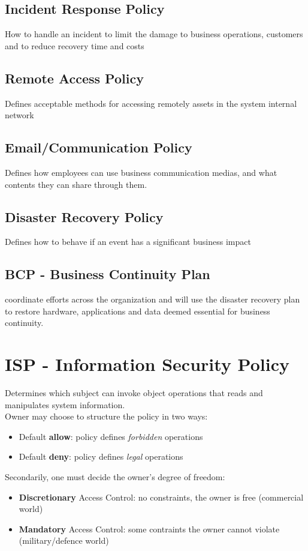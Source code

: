 \subsection*{Incident Response Policy}
How to handle an incident to limit the damage to business operations, customers and to reduce recovery time and costs
\subsection*{Remote Access Policy}
Defines acceptable methods for accessing remotely assets in the system internal network
\subsection*{Email/Communication Policy}
Defines how employees can use business communication medias, and what contents they can share through them.
\subsection*{Disaster Recovery Policy}
Defines how to behave if an event has a significant business impact
\subsection*{BCP - Business Continuity Plan}
coordinate efforts across the organization and will use
the disaster recovery plan to restore hardware, applications
and data deemed essential for business continuity.

\section{ISP - Information Security Policy}
\label{sec:information_security_policy}
Determines which subject can invoke object operations that reads and manipulates system information.\\
Owner may choose to structure the policy in two ways:
\begin{itemize}
    \item Default \textbf{allow}: policy defines \textit{forbidden} operations
    \item Default \textbf{deny}: policy defines \textit{legal} operations
\end{itemize}
Secondarily, one must decide the owner's degree of freedom:
\begin{itemize}
    \item \textbf{Discretionary} Access Control: no constraints, the owner is free (commercial world)
    \item \textbf{Mandatory} Access Control: some contraints the owner cannot violate (military/defence world)
\end{itemize}

